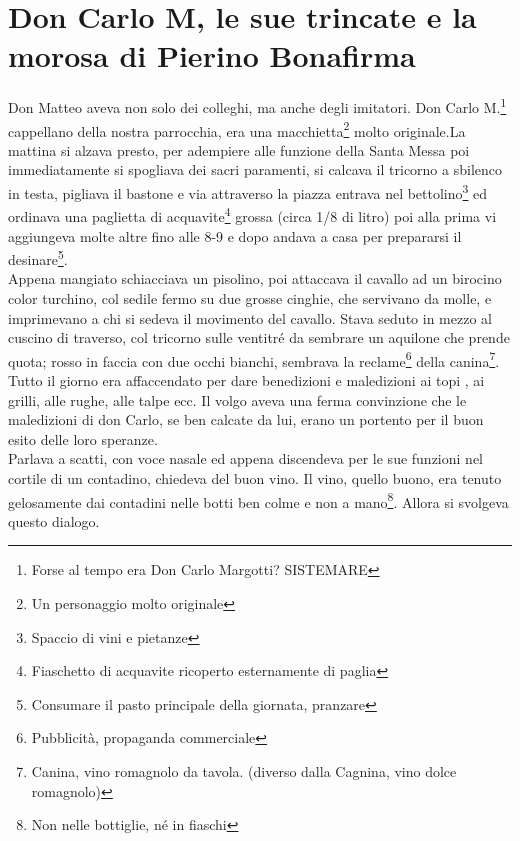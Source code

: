 
\chapter{Don Carlo M, le sue trincate e la morosa di Pierino Bonafirma}
Don Matteo aveva non solo dei colleghi, ma anche degli imitatori. Don Carlo M.\footnote{Forse al tempo era Don Carlo Margotti? SISTEMARE} cappellano della nostra parrocchia, era una macchietta\footnote{Un personaggio molto originale} molto originale.La mattina si alzava presto, per adempiere alle funzione della Santa Messa poi immediatamente si spogliava dei sacri paramenti, si calcava il tricorno a sbilenco in testa, pigliava il bastone e via attraverso la piazza entrava nel bettolino\footnote{Spaccio di vini e pietanze} ed ordinava una paglietta di acquavite\footnote{Fiaschetto di acquavite ricoperto esternamente di paglia} grossa (circa 1/8 di litro) poi alla prima vi aggiungeva molte altre fino alle 8-9 e dopo andava a casa per prepararsi il desinare\footnote{Consumare il pasto principale della giornata, pranzare}.\\
Appena mangiato schiacciava un pisolino, poi attaccava il cavallo ad un birocino color turchino, col sedile fermo su due grosse cinghie, che servivano da molle, e imprimevano a chi si sedeva il movimento del cavallo. Stava seduto in mezzo al cuscino di traverso, col tricorno sulle ventitré da sembrare un aquilone che prende quota; rosso in faccia con due occhi bianchi, sembrava la reclame\footnote{Pubblicità, propaganda commerciale} della canina\footnote{Canina, vino romagnolo da tavola. (diverso dalla Cagnina, vino dolce romagnolo)}.\\ 
Tutto il giorno era affaccendato per dare benedizioni e maledizioni ai topi , ai grilli, alle rughe, alle talpe ecc. Il volgo aveva una ferma convinzione che le maledizioni di don Carlo, se ben calcate da lui, erano un portento per il buon esito delle loro speranze. \\
Parlava a scatti, con voce nasale ed appena discendeva per le sue funzioni nel cortile di un contadino, chiedeva del buon vino. Il vino, quello buono, era tenuto gelosamente dai contadini nelle botti ben colme e non a mano\footnote{Non nelle bottiglie, né in fiaschi}. Allora si svolgeva questo dialogo. \\
